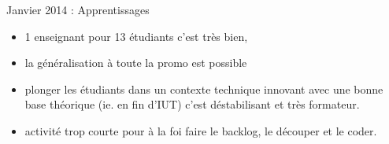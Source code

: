 \documentclass{beamer}
\begin{document}
\begin{frame}{Janvier 2014 : Apprentissages}
  \begin{itemize}
    \item 1 enseignant pour 13 étudiants c'est très bien,
    \item la généralisation à toute la promo est possible
    \item plonger les étudiants dans un contexte technique innovant avec une bonne base théorique (ie. en fin d'IUT) c'est déstabilisant et très formateur. 
    \item activité trop courte pour à la foi faire le backlog, le découper et le coder.
  \end{itemize}
\end{frame}

\end{document}
